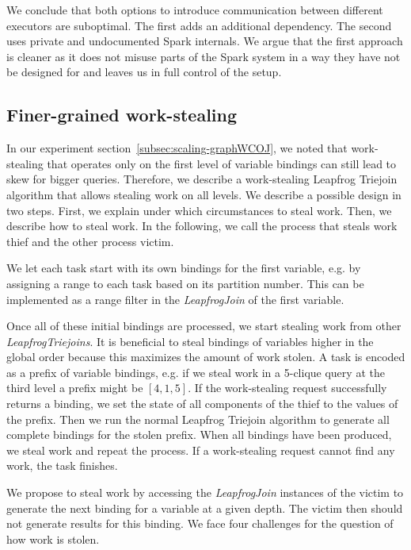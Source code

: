 We conclude that both options to introduce communication between different executors are suboptimal.
The first adds an additional dependency.
The second uses private and undocumented Spark internals.
We argue that the first approach is cleaner as it does not misuse parts of the Spark system in a way they have not be designed for
and leaves us in full control of the setup.

\subsection{Finer-grained work-stealing} \label{subsubsec:finer-grained-work-stealing}
In our experiment section~\ref{subsec:scaling-graphWCOJ}, we noted that work-stealing that
operates only on the first level of variable bindings can still lead to skew for bigger queries.
Therefore, we describe a work-stealing Leapfrog Triejoin algorithm that allows stealing work
on all levels.
We describe a possible design in two steps.
First, we explain under which circumstances to steal work.
Then, we describe how to steal work.
In the following, we call the process that steals work thief and the other process
victim.

We let each task start with its own bindings for the first variable, e.g. by assigning
a range to each task based on its partition number.
This can be implemented as a range filter in the \textit{LeapfrogJoin} of the first variable.

Once all of these initial bindings are processed, we start stealing work from other
\textit{LeapfrogTriejoins}.
It is beneficial to steal bindings of variables higher in the global order because this
maximizes the amount of work stolen.
A task is encoded as a prefix of variable bindings, e.g. if we steal work in a 5-clique query at
the third level a prefix might be $[4, 1, 5]$.
If the work-stealing request successfully returns a binding, we set the state of all components
of the thief to the values of the prefix.
Then we run the normal Leapfrog Triejoin algorithm to generate all complete bindings for the stolen
prefix.
When all bindings have been produced, we steal work and repeat the process.
If a work-stealing request cannot find any work, the task finishes.

We propose to steal work by accessing the \textit{LeapfrogJoin} instances of the victim to generate
the next binding for a variable at a given depth.
The victim then should not generate results for this binding.
We face four challenges for the question of how work is stolen.

